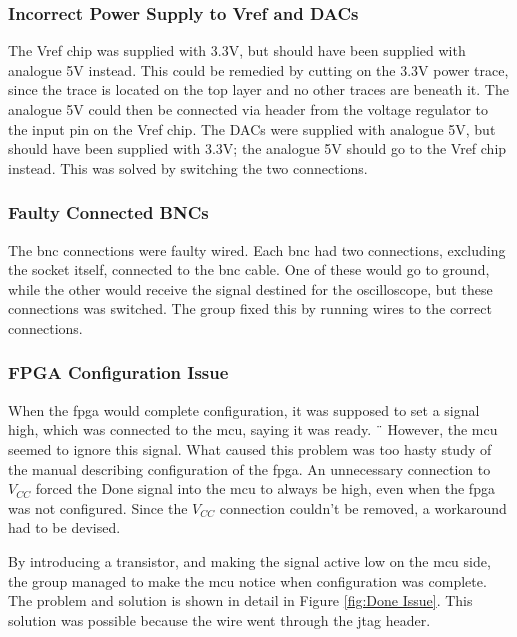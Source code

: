 \subsubsection{Incorrect Power Supply to Vref and DACs}
The Vref chip was supplied with 3.3V, but should have been supplied with analogue 5V instead.
This could be remedied by cutting on the 3.3V power trace, since the trace is located on the top layer and no other traces are beneath it.
The analogue 5V could then be connected via header from the voltage regulator to the input pin on the Vref chip.
\newline
The DACs were supplied with analogue 5V, but should have been supplied with 3.3V; the analogue 5V should go to the Vref chip instead.
This was solved by switching the two connections.

\subsubsection{Faulty Connected BNCs}
The \gls{bnc} connections were faulty wired.
Each \gls{bnc} had two connections, excluding the socket itself, connected to the \gls{bnc} cable.
One of these would go to ground, while the other would receive the signal destined for the oscilloscope, but these connections was switched.
The group fixed this by running wires to the correct connections.

\subsubsection{FPGA Configuration Issue}
When the \gls{fpga} would complete configuration, it was supposed to set a signal high, which was connected to the \gls{mcu}, saying it was ready. ¨
However, the \gls{mcu} seemed to ignore this signal.
What caused this problem was too hasty study of the manual describing configuration of the \gls{fpga}.
An unnecessary connection to \(V_{CC}\) forced the Done signal into the \gls{mcu} to always be high, even when the \gls{fpga} was not configured.
Since the \(V_{CC}\) connection couldn't be removed, a workaround had to be devised.

By introducing a transistor, and making the signal active low on the \gls{mcu} side, the group managed to make the \gls{mcu} notice when configuration was complete.
The problem and solution is shown in detail in Figure \ref{fig:Done Issue}.
This solution was possible because the wire went through the \gls{jtag} header.

